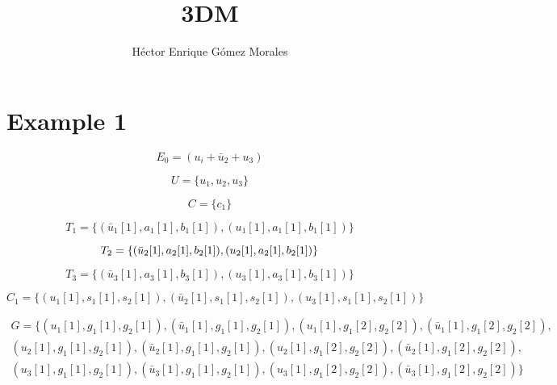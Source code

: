 \documentclass{article}
\author{Héctor Enrique Gómez Morales}
\title{3DM}
\begin{document}
\maketitle
\section{Example 1}

\begin{equation*}
E_0 =  ( u_i + \bar{u}_2 + u_3  )
\end{equation*}

\begin{equation*}
U =  \{ u_1, u_2, u_3  \}
\end{equation*}

\begin{equation*}
C =  \{ c_1  \}  
\end{equation*}

\begin{equation*}
  T_1 =  \{  ( \bar{u}_1[1],  a_1[1], b_1[1]   ),   ( u_1[1],  a_1[1], b_1[1]   )  \}
\end{equation*}

\begin{equation*}
  T_2 =  \{  ( \bar{u}_2[1],  a_2[1], b_2[1]   ),   ( u_2[1],  a_2[1], b_2[1]   )  \} \\
\end{equation*}

\begin{equation*}
  T_3 =  \{  ( \bar{u}_3[1],  a_3[1], b_3[1]   ),   ( u_3[1],  a_3[1], b_3[1]   )  \}
\end{equation*}

\begin{equation*}
  C_1 =  \{  ( u_1[1],  s_1[1], s_2[1]   ),  ( \bar{u}_2[1],  s_1[1], s_2[1]  ),  ( u_3[1],  s_1[1], s_2[1]   )  \}
\end{equation*}

\begin{equation*}
\begin{split}
  G =  \{  ( u_1[1], g_1[1], g_2[1]  ),  (\bar{u}_1[1], g_1[1], g_2[1]  ),  ( u_1[1], g_1[2], g_2[2]  ),  ( \bar{u}_1[1], g_1[2], g_2[2]  ),\\
  ( u_2[1], g_1[1], g_2[1]  ),  ( \bar{u}_2[1], g_1[1], g_2[1]  ),  ( u_2[1], g_1[2], g_2[2]  ),  ( \bar{u}_2[1], g_1[2], g_2[2]  ),\\
  ( u_3[1], g_1[1], g_2[1]  ),  ( \bar{u}_3[1], g_1[1], g_2[1]  ),  ( u_3[1], g_1[2], g_2[2]  ),  ( \bar{u}_3[1], g_1[2], g_2[2]  ) \}
\end{split}
\end{equation*}
\end{document}
